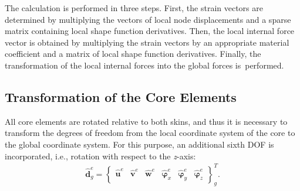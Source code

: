 \documentclass[sensors,article,accept,moreauthors,pdftex]{Definitions/mdpi}
\begin{document}
\begin{paracol}{2}
The calculation is performed in three steps.
First, the strain vectors are determined by multiplying the vectors of local node displacements and a sparse matrix containing local shape function derivatives.
Then, the local internal force vector is obtained by multiplying the strain vectors by an appropriate material coefficient and a matrix of local shape function derivatives.
Finally, the transformation of the local internal forces into the global forces is~performed.

\subsection{Transformation of the Core Elements}
\label{sec:transformation}
All core elements are rotated relative to both skins, and thus it is necessary to transform the degrees of freedom from the local coordinate system of the core to the global coordinate system.
For this purpose, an additional sixth DOF is incorporated, i.e., rotation with respect to the \textit{z}-axis:
\begin{eqnarray}
	\widehat{\textbf{d}}^e_g = \left \{\begin{array}{cccccc}
		\widehat{\textbf{u}}^e & \widehat{\textbf{v}}^e &
		\widehat{\textbf{w}}^e & \widehat{\boldsymbol{\varphi}}_x^e &
		\widehat{\boldsymbol{\varphi}}_y^e & \widehat{\boldsymbol{\varphi}}_z^e
	\end{array}\right \}^T_g.
	\label{eq:d6}
\end{eqnarray}


\end{paracol}
\end{document}
